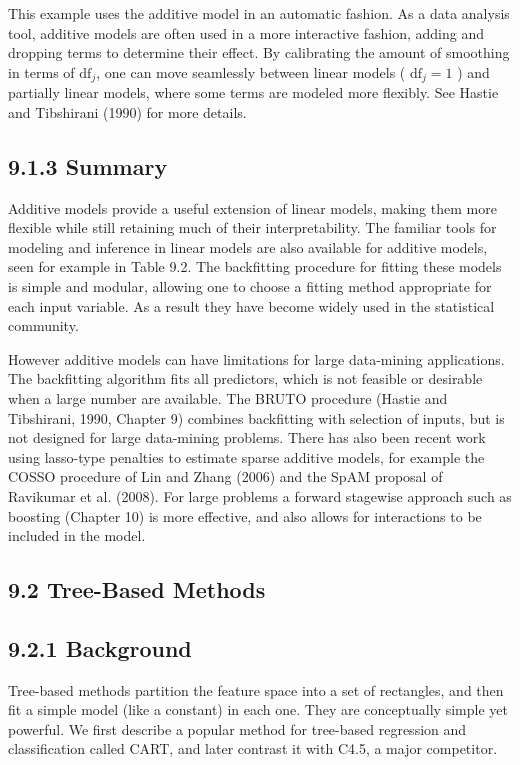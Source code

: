 \documentclass[10pt]{article}
\begin{document}
This example uses the additive model in an automatic fashion. As a data analysis tool, additive models are often used in a more interactive fashion, adding and dropping terms to determine their effect. By calibrating the amount of smoothing in terms of $\mathrm{df}_{j}$, one can move seamlessly between linear models ( $\mathrm{df}_{j}=1$ ) and partially linear models, where some terms are modeled more flexibly. See Hastie and Tibshirani (1990) for more details.

\subsection*{9.1.3 Summary}
Additive models provide a useful extension of linear models, making them more flexible while still retaining much of their interpretability. The familiar tools for modeling and inference in linear models are also available for additive models, seen for example in Table 9.2. The backfitting procedure for fitting these models is simple and modular, allowing one to choose a fitting method appropriate for each input variable. As a result they have become widely used in the statistical community.

However additive models can have limitations for large data-mining applications. The backfitting algorithm fits all predictors, which is not feasible or desirable when a large number are available. The BRUTO procedure (Hastie and Tibshirani, 1990, Chapter 9) combines backfitting with selection of inputs, but is not designed for large data-mining problems. There has also been recent work using lasso-type penalties to estimate sparse additive models, for example the COSSO procedure of Lin and Zhang (2006) and the SpAM proposal of Ravikumar et al. (2008). For large problems a forward stagewise approach such as boosting (Chapter 10) is more effective, and also allows for interactions to be included in the model.

\subsection*{9.2 Tree-Based Methods}
\subsection*{9.2.1 Background}
Tree-based methods partition the feature space into a set of rectangles, and then fit a simple model (like a constant) in each one. They are conceptually simple yet powerful. We first describe a popular method for tree-based regression and classification called CART, and later contrast it with C4.5, a major competitor.
\end{document}
